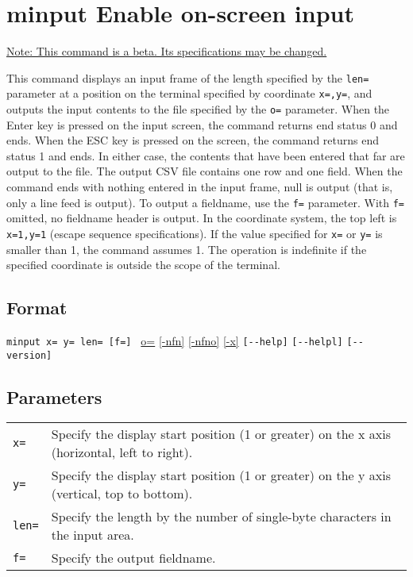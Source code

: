 
%

\section{minput Enable on-screen input\label{sect:minput}}
\underline{Note: This command is a beta. Its specifications may be changed.}

This command displays an input frame of the length specified by the \verb|len=| parameter at a position on the terminal specified by coordinate \verb|x=,y=|, and outputs the input contents to the file specified by the \verb|o=| parameter. When the Enter key is pressed on the input screen, the command returns end status 0 and ends. When the ESC key is pressed on the screen, the command returns end status 1 and ends. In either case, the contents that have been entered that far are output to the file.
The output CSV file contains one row and one field. When the command ends with nothing entered in the input frame, null is output (that is, only a line feed is output). To output a fieldname, use the \verb|f=| parameter. With \verb|f=| omitted, no fieldname header is output. 
In the coordinate system, the top left is \verb|x=1,y=1| (escape sequence specifications). If the value specified for \verb|x=| or \verb|y=| is smaller than 1, the command assumes 1. The operation is indefinite if the specified coordinate is outside the scope of the terminal.

\subsection*{Format}
\verb/minput x= y= len= [f=] /
\hyperref[sect:option_o]{o=}
\hyperref[sect:option_nfn]{[-nfn]} 
\hyperref[sect:option_nfno]{[-nfno]}  
\hyperref[sect:option_x]{[-x]}
\verb|[--help]|
\verb|[--helpl]|
\verb|[--version]|\\

\subsection*{Parameters}
\begin{table}[htbp]
{\small
\begin{tabular}{ll}
\verb|x=|   & Specify the display start position (1 or greater) on the x axis (horizontal, left to right).\\
\verb|y=|   & Specify the display start position (1 or greater) on the y axis (vertical, top to bottom).\\
\verb|len=| & Specify the length by the number of single-byte characters in the input area.\\
\verb|f=|   & Specify the output fieldname.\\
\end{tabular} 
}
\end{table} 

